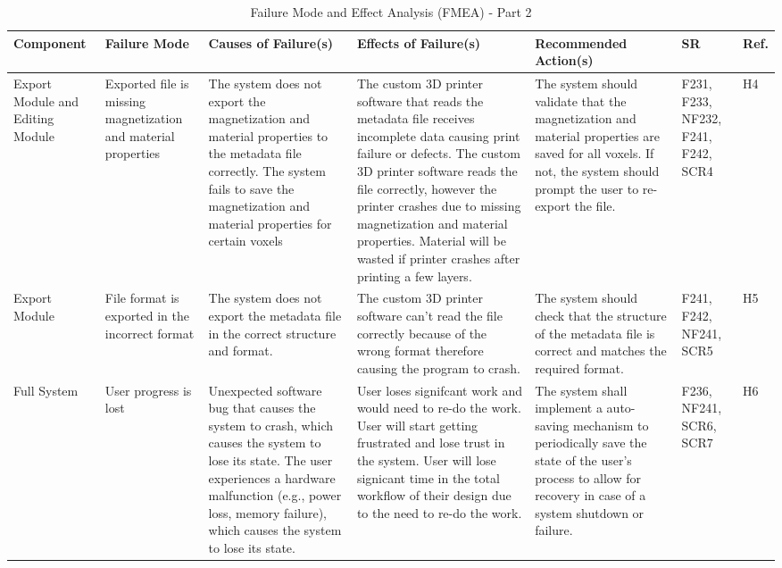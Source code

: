 \documentclass{article}
\begin{document}
\begin{landscape}
\begin{table}[H]
\centering
\caption{Failure Mode and Effect Analysis (FMEA) - Part 2}
\renewcommand{\arraystretch}{1.1} 
\footnotesize 
\begin{tabular}{|p{3cm}|p{3cm}|p{3.8cm}|p{3.8cm}|p{5.5cm}|p{2cm}|p{1cm}|}
\hline
\textbf{Component} & \textbf{Failure Mode} & \textbf{Causes of Failure(s)} & \textbf{Effects of Failure(s)} & \textbf{Recommended Action(s)} & \textbf{SR} & \textbf{Ref.} \\
\hline
Export Module and Editing Module & Exported file is missing magnetization and material properties& \textbullet{} The system does not export the magnetization and material properties to the metadata file correctly. \newline \textbullet{} The system fails to save the magnetization and material properties for certain voxels & \textbullet{} The custom 3D printer software that reads the metadata file receives incomplete data causing print failure or defects. \newline \textbullet{} The custom 3D printer software reads the file correctly, however the printer crashes due to missing magnetization and material properties. \newline \textbullet{} Material will be wasted if printer crashes after printing a few layers. & The system should validate that the magnetization and material properties are saved for all voxels. If not, the system should prompt the user to re-export the file. & F231, F233, NF232, F241, F242, SCR4 & H4 \\
\hline
Export Module & File format is exported in the incorrect format & \textbullet{} The system does not export the metadata file in the correct structure and format. & The custom 3D printer software can't read the file correctly because of the wrong format therefore causing the program to crash. & The system should check that the structure of the metadata file is correct and matches the required format. & F241, F242, NF241, SCR5 & H5 \\
\hline
Full System & User progress is lost & \textbullet{} Unexpected software bug that causes the system to crash, which causes the system to lose its state. \newline \textbullet{} The user experiences a hardware malfunction (e.g., power loss, memory failure), which causes the system to lose its state. & \textbullet{} User loses signifcant work and would need to re-do the work. \newline \textbullet{} User will start getting frustrated and lose trust in the system. \newline \textbullet{} User will lose signicant time in the total workflow of their design due to the need to re-do the work. & The system shall implement a auto-saving mechanism to periodically save the state of the user's process to allow for recovery in case of a system shutdown or failure. & F236, NF241, SCR6, SCR7 & H6 \\
\hline
\end{tabular}
\end{table}
\end{landscape}
\restoregeometry
\end{document}
